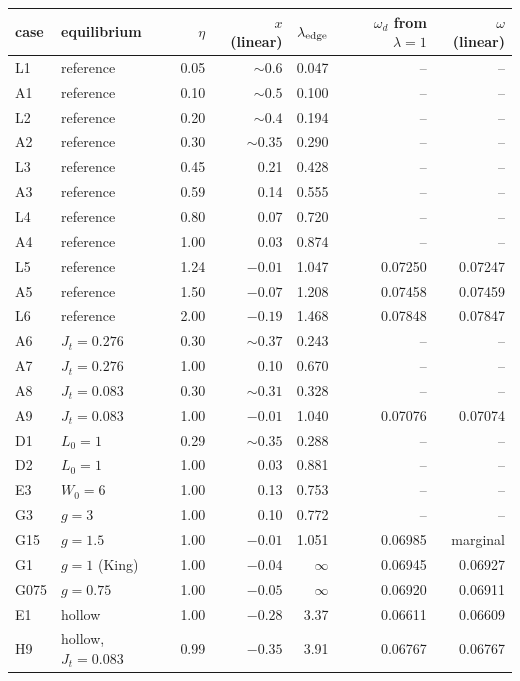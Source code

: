 \documentclass[11pt,a4paper]{article}
\begin{document}
\begin{table}[!htbp]
\centering
\small
\begin{tabular}{llrrrrr}
\toprule
case & equilibrium & $\eta$ & $x$ (linear) & $\lambda_{\rm edge}$ & $\omega_d$ from $\lambda=1$ & $\omega$ (linear)\\
\midrule
L1 & reference & 0.05 & $\sim0.6$ & 0.047 & -- & --\\
A1 & reference & 0.10 & $\sim0.5$ & 0.100 & -- & --\\
L2 & reference & 0.20 & $\sim0.4$ & 0.194 & -- & --\\
A2 & reference & 0.30 & $\sim0.35$ & 0.290 & -- & --\\
L3 & reference & 0.45 & 0.21 & 0.428 & -- & --\\
A3 & reference & 0.59 & 0.14 & 0.555 & -- & --\\
L4 & reference & 0.80 & 0.07 & 0.720 & -- & --\\
A4 & reference & 1.00 & 0.03 & 0.874 & -- & --\\
L5 & reference & 1.24 & $-0.01$ & 1.047 & 0.07250 & 0.07247\\
A5 & reference & 1.50 & $-0.07$ & 1.208 & 0.07458 & 0.07459\\
L6 & reference & 2.00 & $-0.19$ & 1.468 & 0.07848 & 0.07847\\
\midrule
A6 & $J_t=0.276$ & 0.30 & $\sim0.37$ & 0.243 & -- & --\\
A7 & $J_t=0.276$ & 1.00 & 0.10 & 0.670 & -- & --\\
A8 & $J_t=0.083$ & 0.30 & $\sim0.31$ & 0.328 & -- & --\\
A9 & $J_t=0.083$ & 1.00 & $-0.01$ & 1.040 & 0.07076 & 0.07074\\
D1 & $L_0=1$ & 0.29 & $\sim0.35$ & 0.288 & -- & --\\
D2 & $L_0=1$ & 1.00 & 0.03 & 0.881 & -- & --\\
E3 & $W_0=6$ & 1.00 & 0.13 & 0.753 & -- & --\\
G3 & $g=3$ & 1.00 & 0.10 & 0.772 & -- & --\\
G15 & $g=1.5$ & 1.00 & $-0.01$ & 1.051 & 0.06985 & marginal\\
G1 & $g=1$ (King) & 1.00 & $-0.04$ & $\infty$ & 0.06945 & 0.06927\\
G075 & $g=0.75$ & 1.00 & $-0.05$ & $\infty$ & 0.06920 & 0.06911\\
\midrule
E1 & hollow & 1.00 & $-0.28$ & 3.37 & 0.06611 & 0.06609\\
H9 & hollow, $J_t=0.083$ & 0.99 & $-0.35$ & 3.91 & 0.06767 & 0.06767\\

\end{tabular}
\end{table}
\end{document}
